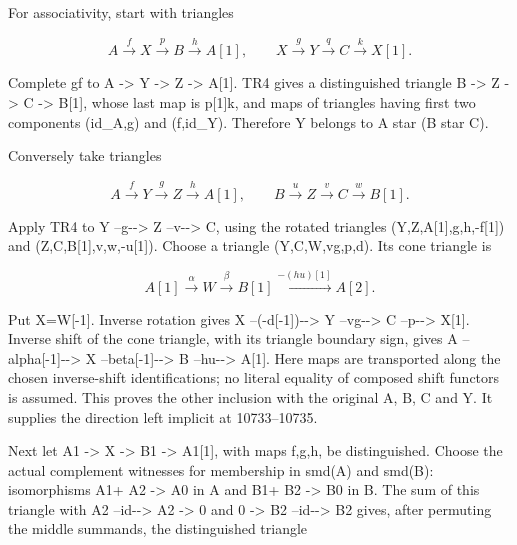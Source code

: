 For associativity,\allowbreak{} start with triangles

\[
 A\xrightarrow f X\xrightarrow p B\xrightarrow h A[1],
 \qquad X\xrightarrow g Y\xrightarrow q C\xrightarrow k X[1].
\]

Complete gf to A \allowbreak{}-> Y \allowbreak{}-> Z \allowbreak{}-> A[1]\allowbreak{}. TR4 gives a distinguished triangle B \allowbreak{}-> Z \allowbreak{}-> C \allowbreak{}-> B[1]\allowbreak{},\allowbreak{} whose last map is p[1]\allowbreak{}k,\allowbreak{} and maps of triangles having first two components (id\_\allowbreak{}A,\allowbreak{}g)\allowbreak{} and (f,\allowbreak{}id\_\allowbreak{}Y)\allowbreak{}. Therefore Y belongs to A star (B star C)\allowbreak{}.

Conversely take triangles

\[
 A\xrightarrow f Y\xrightarrow g Z\xrightarrow h A[1],
 \qquad B\xrightarrow u Z\xrightarrow v C\xrightarrow w B[1].
\]

Apply TR4 to Y --g-\allowbreak{}-> Z --v-\allowbreak{}-> C,\allowbreak{} using the rotated triangles (Y,\allowbreak{}Z,\allowbreak{}A[1]\allowbreak{},\allowbreak{}g,\allowbreak{}h,\allowbreak{}-f[1]\allowbreak{})\allowbreak{} and (Z,\allowbreak{}C,\allowbreak{}B[1]\allowbreak{},\allowbreak{}v,\allowbreak{}w,\allowbreak{}-u[1]\allowbreak{})\allowbreak{}. Choose a triangle (Y,\allowbreak{}C,\allowbreak{}W,\allowbreak{}vg,\allowbreak{}p,\allowbreak{}d)\allowbreak{}. Its cone triangle is

\[
 A[1]\xrightarrow\alpha W\xrightarrow\beta B[1]
       \xrightarrow{-(hu)[1]} A[2].
\]

Put X\allowbreak{}=W[-1]\allowbreak{}. Inverse rotation gives X --(-d[-1]\allowbreak{})\allowbreak{}-\allowbreak{}-> Y --vg-\allowbreak{}-> C --p-\allowbreak{}-> X[1]\allowbreak{}. Inverse shift of the cone triangle,\allowbreak{} with its triangle boundary sign,\allowbreak{} gives A --alpha[-1]\allowbreak{}-\allowbreak{}-> X --beta[-1]\allowbreak{}-\allowbreak{}-> B --hu-\allowbreak{}-> A[1]\allowbreak{}. Here maps are transported along the chosen inverse-shift identifications; no literal equality of composed shift functors is assumed. This proves the other inclusion with the original A,\allowbreak{} B,\allowbreak{} C and Y. It supplies the direction left implicit at 10733–\allowbreak{}10735.

Next let A1 \allowbreak{}-> X \allowbreak{}-> B1 \allowbreak{}-> A1[1]\allowbreak{},\allowbreak{} with maps f,\allowbreak{}g,\allowbreak{}h,\allowbreak{} be distinguished. Choose the actual complement witnesses for membership in smd(A)\allowbreak{} and smd(B)\allowbreak{}:\allowbreak{} isomorphisms A1\allowbreak{}+ A2 \allowbreak{}-> A0 in A and B1\allowbreak{}+ B2 \allowbreak{}-> B0 in B. The sum of this triangle with A2 --id-\allowbreak{}-> A2 \allowbreak{}-> 0 and 0 \allowbreak{}-> B2 --id-\allowbreak{}-> B2 gives,\allowbreak{} after permuting the middle summands,\allowbreak{} the distinguished triangle

